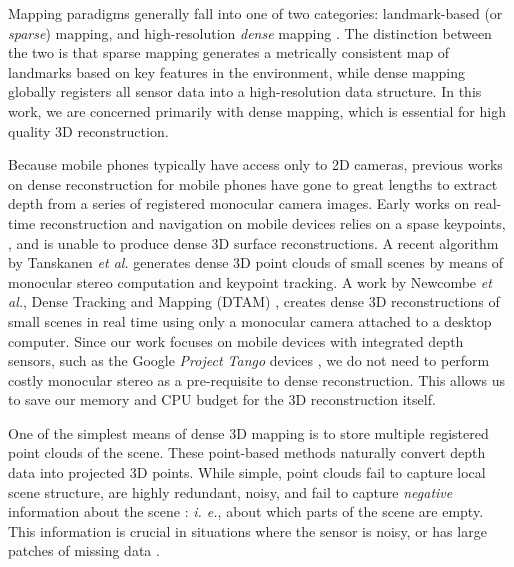 \documentclass[conference]{IEEEtran}
\newcommand{\ie}{\textit{i. e.}}
\newcommand{\etal}{\textit{et al.}}
\begin{document}
Mapping paradigms generally fall into one of two categories: landmark-based (or
\emph{sparse}) mapping, and high-resolution \emph{dense} mapping
\cite{FastSlam}.  The distinction between the two is that sparse mapping
generates a metrically consistent map of landmarks based on key features in the
environment, while dense mapping globally registers all sensor data into a
high-resolution data structure. In this work, we are concerned primarily with
dense mapping, which is essential for high quality 3D reconstruction.

Because mobile phones typically have access only to 2D cameras, previous works
on dense reconstruction for mobile phones have gone to great lengths to extract
depth from a series of registered monocular camera images.  Early works on
real-time reconstruction and navigation on mobile devices relies on a spase
keypoints, \cite{KleinSparse}, and is unable to produce dense 3D surface
reconstructions.  A recent algorithm by Tanskanen \etal
\cite{TanskanenMetric} generates dense 3D point clouds of small scenes
by means of monocular stereo computation and keypoint tracking. 
 A work by Newcombe \etal, Dense Tracking and Mapping (DTAM) \cite{DTAM}, 
 creates dense 3D reconstructions of small scenes in real time using only a
 monocular camera attached to a desktop computer. Since our work focuses on
 mobile devices with integrated depth sensors, such as the Google \emph{Project Tango}
 devices \cite{Tango}, we do not need to perform costly monocular stereo as a
 pre-requisite to dense reconstruction. This allows us to save our memory and
 CPU budget for the 3D reconstruction itself.

One of the simplest means of dense 3D mapping is to  store multiple registered
point clouds of the scene. These point-based methods \cite{RusinkiewiczPoints,
TanskanenMetric, WeiseScanning} naturally convert depth data into projected 3D
points. While simple, point clouds fail to capture local scene structure, are
highly redundant, noisy, and fail to capture \emph{negative} information about
the scene :  \ie, about which parts of the scene are empty. This information is
crucial in situations where the sensor is noisy, or has large patches of
missing data \cite{Klingensmith2014}.
\end{document}
